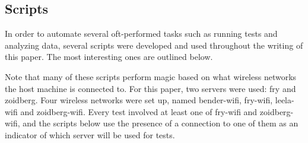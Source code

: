 \documentclass[12pt,a4paper]{article}
\begin{document}
\subsection{Scripts}
In order to automate several oft-performed tasks such as running tests and
analyzing data, several scripts were developed and used throughout the writing
of this paper. The most interesting ones are outlined below.

Note that many of these scripts perform magic based on what wireless networks
the host machine is connected to. For this paper, two servers were used: fry and
zoidberg. Four wireless networks were set up, named bender-wifi, fry-wifi,
leela-wifi and zoidberg-wifi. Every test involved at least one of fry-wifi and
zoidberg-wifi, and the scripts below use the presence of a connection to one of
them as an indicator of which server will be used for tests.
\end{document}
